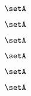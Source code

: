 {\begin{forslides}
        \begin{equation}
            \label{eq:parallelism-184}
            \setA
        \end{equation}

        \begin{equation}
            \label{eq:parallelism-185}
            \setA
        \end{equation}

        \begin{equation}
            \label{eq:parallelism-186}
            \setA
        \end{equation}

        \begin{equation}
            \label{eq:parallelism-187}
            \setA
        \end{equation}

        \begin{equation}
            \label{eq:parallelism-188}
            \setA
        \end{equation}

        \begin{equation}
            \label{eq:parallelism-189}
            \setA
        \end{equation}

    \end{forslides}
}